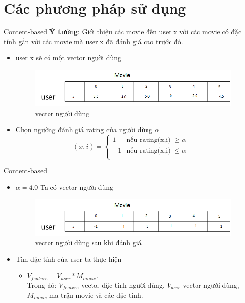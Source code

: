 \documentclass{beamer}
\newcommand{\bi}{\begin{itemize}}
\newcommand{\ei}{\end{itemize}}
\begin{document}
\section{Các phương pháp sử dụng}

\begin{frame}{Content-based}
\textbf{Ý tưởng}: Giới thiệu các movie đến user x với các movie có đặc tính gần với các movie mà user x đã đánh giá cao trước đó.
\bi
\item user x sẽ có một vector người dùng
\begin{figure}[h]
\begin{center}
\includegraphics[width =0.7 \textwidth]{img1.png}
\caption{vector người dùng}
\end{center}
\end{figure}
\item Chọn ngưỡng đánh giá rating của người dùng $\alpha$
\begin{displaymath}
(x,i) = \left\{ \begin{array}{ll}
1 & \textrm{nếu rating(x,i) $\geq \alpha $}\\
-1 & \textrm{nếu rating(x,i) $\le \alpha$ }\\
\end{array} \right.
\end{displaymath}
\ei
\end{frame}
\begin{frame}{Content-based}
\bi
\item $\alpha = 4.0$ Ta có vector người dùng
\begin{figure}[h]
\begin{center}
\includegraphics[width =0.7 \textwidth]{img2.png}
\caption{vector người dùng sau khi đánh giá}
\end{center}
\end{figure}
\item Tìm đặc tính của user ta thực hiện:
\bi
\item  $V_{feature}  =  V_{user} * M_{movie}$. \\
Trong đó: $V_{feature}$ vector đặc tính người dùng, $V_{user}$ vector người dùng, $M_{movie}$ ma trận movie và các đặc tính.
\ei
\ei
\end{frame}
\end{document}

